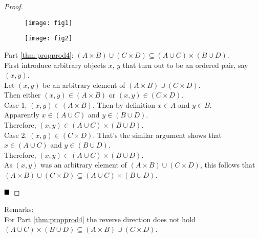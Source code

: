 \documentclass{article}
\begin{document}
\begin{proof}
\begin{figure}[H]
  \centering
  \texttt{[image: fig1]}\\
  
  \bigskip
  
  \texttt{[image: fig2]}\\
\end{figure}

Part \ref{thm:propprod4}:  $(A \times B) \cup (C \times D) \subseteq (A \cup C) \times (B \cup D)$.\\
First introduce arbitrary objects $x$, $y$ that turn out to be an ordered pair, say $(x, y)$.\\
Let $(x,y)$ be an arbitrary element of $(A \times B) \cup (C \times D)$.\\
Then either $(x,y) \in (A \times B)$ or $(x,y) \in (C \times D)$.\\
\newline
Case 1. $(x,y) \in (A \times B)$. Then by definition $x \in A$ and $y \in B$.\\
Apparently $x \in (A \cup C)$ and $y \in (B \cup D)$.\\
Therefore, $(x,y) \in (A \cup C) \times (B \cup D)$.\\
\newline
Case 2. $(x,y) \in (C \times D)$. That's the similar argument shows that $x \in (A \cup C)$ and $y \in (B \cup D)$.\\
Therefore, $(x,y) \in (A \cup C) \times (B \cup D)$.\\
\newline
As $(x,y)$ was an arbitrary element of $(A \times B) \cup (C \times D)$, this follows that $(A \times B) \cup (C \times D) \subseteq (A \cup C) \times (B \cup D)$.

$\hfill\blacksquare$
\end{proof}
Remarks:\\
For Part \ref{thm:propprod4} the reverse direction does not hold $(A \cup C) \times (B \cup D) \subseteq (A \times B) \cup (C \times D)$.\\
\end{document}
